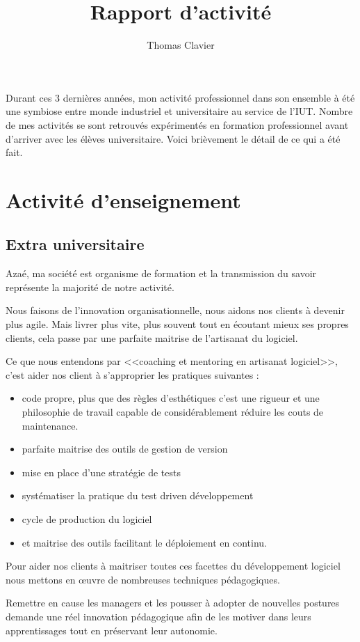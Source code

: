 \documentclass[a4paper]{article}
\title{Rapport d’activité}
\author{Thomas Clavier}
\begin{document}
\maketitle

Durant ces 3 dernières années, mon activité professionnel dans son ensemble à été une symbiose entre monde industriel et universitaire au service de l'IUT. 
Nombre de mes activités se sont retrouvés expérimentés en formation professionnel avant d'arriver avec les élèves universitaire.
Voici brièvement le détail de ce qui a été fait.

\section{Activité d'enseignement}
\subsection{Extra universitaire}
Azaé, ma société est organisme de formation et la transmission du savoir représente la majorité de notre activité.

Nous faisons de l'innovation organisationnelle, nous aidons nos clients à devenir plus agile. Mais livrer plus vite, plus souvent tout en écoutant mieux ses propres clients, cela passe par une parfaite maitrise de l'artisanat du logiciel.

Ce que nous entendons par <<coaching et mentoring en artisanat logiciel>>, c'est aider nos client à s'approprier les pratiques suivantes : 
\begin{itemize}
  \item code propre, plus que des règles d'esthétiques c'est une rigueur et une philosophie de travail capable de considérablement réduire les couts de maintenance.
  \item parfaite maitrise des outils de gestion de version
  \item mise en place d'une stratégie de tests 
  \item systématiser la pratique du test driven développement
  \item cycle de production du logiciel
  \item et maitrise des outils facilitant le déploiement en continu.
\end{itemize}

Pour aider nos clients à maitriser toutes ces facettes du développement logiciel nous mettons en œuvre de nombreuses techniques pédagogiques.

Remettre en cause les managers et les pousser à adopter de nouvelles postures demande une réel innovation pédagogique afin de les motiver dans leurs apprentissages tout en préservant leur autonomie.
\end{document}
